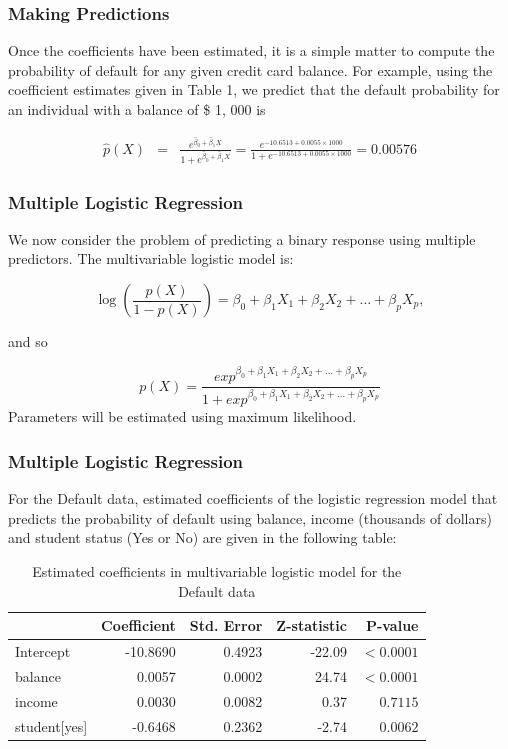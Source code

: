 \documentclass{beamer}
\begin{document}
\frame
{\frametitle{Making Predictions}
Once the coefficients have been estimated, it is a simple matter to compute the probability of default for any given credit card balance. For example, using the coeﬃcient estimates given in Table 1, we predict that the default probability for an individual with a balance of \$ 1, 000 is

{\large
\begin{eqnarray*}
\hat{p}(X) &=& \frac{e^{\hat{\beta}_0+\hat{\beta}_1X}}{1 + e^{\hat{\beta}_0+\hat{\beta}_1X}}
= \frac{e^{-10.6513+0.0055 \times 1000}}{1 + e^{-10.6513+0.0055 \times 1000}}
=0.00576
\end{eqnarray*}
}
}


\frame
{
\frametitle{Multiple Logistic Regression}

We now consider the problem of predicting a binary response using multiple predictors. The multivariable logistic model is:

\[\log \left(\frac{p(X)}{1-p(X)}\right) = \beta_0 + \beta_1 X_1 + \beta_2 X_2 + \ldots + \beta_p X_p, \]

and so

\[p(X)= \frac{exp^{\beta_0 + \beta_1 X_1 + \beta_2 X_2 + \ldots + \beta_p X_p}}{1+exp^{\beta_0 + \beta_1 X_1 + \beta_2 X_2 + \ldots + \beta_p X_p}} \]
Parameters will be estimated using maximum likelihood.
}




\frame
{\frametitle{Multiple Logistic Regression}

For the Default data, estimated coefficients of the logistic regression model that predicts the probability of default using balance, income (thousands of dollars) and student status (Yes or No) are given in the following table:

\begin{table}
\begin{tabular}{l|rrrr}
\hline
 & Coefficient & Std. Error & Z-statistic & P-value \\
\hline
\alert{Intercept} 	 & -10.8690 & 0.4923 & -22.09 & $<0.0001$ \\
\alert{balance} 	 & 0.0057  & 0.0002 & 24.74   & $<0.0001$ \\
\alert{income} 		 & 0.0030  & 0.0082 & 0.37   & $0.7115$ \\
\alert{student[yes]} & \alert{-0.6468}  & 0.2362 & -2.74   & $0.0062$ \\
\hline
\end{tabular}
\caption{Estimated coefficients in multivariable logistic model  for the Default data}
\vspace{0.5cm}
\end{table}

}
\end{document}
